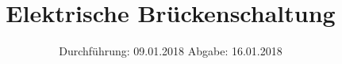 

\subject{V302}
\title{Elektrische Brückenschaltung}
\date{%
  Durchführung: 09.01.2018
  \hspace{3em}
  Abgabe: 16.01.2018
}



\maketitle
\thispagestyle{empty}
\tableofcontents
\newpage






\printbibliography{}


